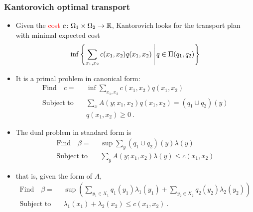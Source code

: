 \documentclass[xcolor=svgnames]{beamer}
\newcommand{\rosso}[1]{\textcolor{red}{#1}}
\renewcommand{\emph}{\rosso}
\begin{document}
\begin{frame}\small\frametitle{Kantorovich optimal transport}
\begin{itemize}
    \item Given the \emph{cost} $c \colon \Omega_1 \times \Omega_2 \to \mathbb{R}$, Kantorovich looks for the transport plan with minimal expected cost
    \begin{equation*}
        \inf \left\{\sum_{x_1,x_2} c(x_1,x_2) q(x_1,x_2) \, \middle| \, q \in \Pi(q_1,q_2) \right\}
    \end{equation*}
    \item It is a primal problem in canonical form:
       \begin{align*}
      \text{Find} \quad c =& \inf \sum_{x_1,x_2} c(x_1,x_2) q(x_1,x_2) \\
      \text{Subject to} \quad &\sum_x A(y;x_1,x_2) q(x_1,x_2) = (q_1 \cup q_2)(y) \\
      &q(x_1,x_2) \geq 0 \ .
    \end{align*}
\end{itemize}

\begin{itemize}
    \item The dual problem in standard form is
    \begin{align*}
      \text{Find} \quad \beta =& \sup \sum_y (q_1 \cup q_2) (y) \lambda(y) \\
      \text{Subject to} \quad &\sum_y A(y;x_1,x_2) \lambda(y) \leq c(x_1,x_2) 
    \end{align*}
\item    that is, given the form of $A$,
\begin{align*}
      \text{Find} \quad \beta =& \sup \left(\sum_{y_1\in X_1}q_1(y_1) \lambda_1(y_1) + \sum_{y_2 \in X_2} q_2(y_2) \lambda_2(y_2)\right) \\
      \text{Subject to} \quad &\lambda_1(x_1) + \lambda_2(x_2) \leq c(x_1,x_2) \ .
    \end{align*}
\end{itemize}


\end{frame}
\end{document}
